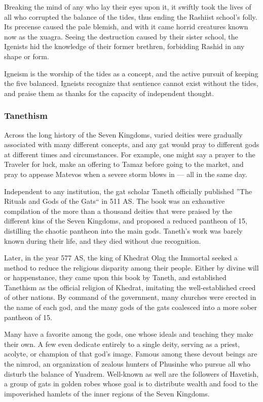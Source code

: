 Breaking the mind of any who lay their eyes upon it, it swiftly took the lives of all who corrupted the balance of the tides, thus ending the Rashiist school's folly.
Its precense caused the pale blemish, and with it came horrid creatures known now as the xuagra.
Seeing the destruction caused by their sister school, the Igenists hid the knowledge of their former brethren, forbidding Rashid in any shape or form.

Igneism is the worship of the tides as a concept, and the active pursuit of keeping the five balanced.
Igneists recognize that sentience cannot exist without the tides, and praise them as thanks for the capacity of independent thought.

\subsubsection{Tanethism}
Across the long history of the Seven Kingdoms, varied deities were gradually associated with many different concepts, and any gat would pray to different gods at different times and circumstances.
For example, one might say a prayer to the Traveler for luck, make an offering to Tamaz before going to the market, and pray to appease Matevos when a severe storm blows in --- all in the same day.

Independent to any institution, the gat scholar Taneth officially published ''The Rituals and Gods of the Gats`` in 511 AS.
The book was an exhaustive compilation of the more than a thousand deities that were praised by the different kins of the Seven Kingdoms, and proposed a reduced pantheon of 15, distilling the chaotic pantheon into the main gods.
Taneth's work was barely known during their life, and they died without due recognition.

Later, in the year 577 AS, the king of Khedrat Olag the Immortal seeked a method to reduce the religious disparity among their people.
Either by divine will or happenstance, they came upon this book by Taneth, and established Tanethism as the official religion of Khedrat, imitating the well-established creed of other nations.
By command of the government, many churches were erected in the name of each god, and the many gods of the gats coalesced into a more sober pantheon of 15.

Many have a favorite among the gods, one whose ideals and teaching they make their own.
A few even dedicate entirely to a single deity, serving as a priest, acolyte, or champion of that god's image.
Famous among these devout beings are the nimrod, an organization of zealous hunters of Phusinhe who pursue all who disturb the balance of Yuadrem.
Well-known as well are the followers of Havetish, a group of gats in golden robes whose goal is to distribute wealth and food to the impoverished hamlets of the inner regions of the Seven Kingdoms.

